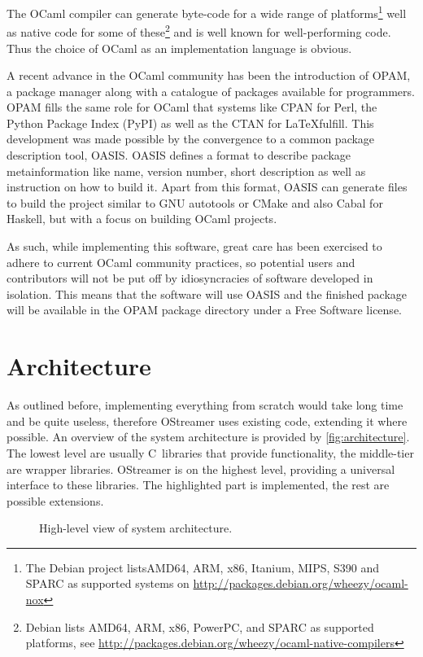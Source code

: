 \documentclass[parskip=half]{scrreprt}
\begin{document}
The OCaml compiler can generate byte-code for a wide range of
platforms\footnote{The Debian project listsAMD64, ARM, x86, Itanium, MIPS, S390
and SPARC as supported systems on
\url{http://packages.debian.org/wheezy/ocaml-nox}} well as native code for some
of these\footnote{Debian lists AMD64, ARM, x86, PowerPC, and SPARC as supported
platforms, see
\url{http://packages.debian.org/wheezy/ocaml-native-compilers}} and is well
known for well-performing code. Thus the choice of OCaml as an implementation
language is obvious.

A recent advance in the OCaml community has been the introduction of OPAM, a
package manager along with a catalogue of packages available for programmers.
OPAM fills the same role for OCaml that systems like CPAN for Perl, the Python
Package Index (PyPI) as well as the CTAN for \LaTeX fulfill. This development
was made possible by the convergence to a common package description tool,
OASIS. OASIS defines a format to describe package metainformation like name,
version number, short description as well as instruction on how to build it.
Apart from this format, OASIS can generate files to build the project similar
to GNU autotools or CMake and also Cabal for Haskell, but with a focus on
building OCaml projects.

As such, while implementing this software, great care has been exercised to
adhere to current OCaml community practices, so potential users and
contributors will not be put off by idiosyncracies of software developed in
isolation. This means that the software will use OASIS and the finished package
will be available in the OPAM package directory under a Free Software license.

\section{Architecture}
\label{sec:architecture}

As outlined before, implementing everything from scratch would take long time
and be quite useless, therefore OStreamer uses existing code, extending it
where possible. An overview of the system architecture is provided by
\autoref{fig:architecture}. The lowest level are usually C~libraries that
provide functionality, the middle-tier are wrapper libraries. OStreamer is on
the highest level, providing a universal interface to these libraries. The
highlighted part is implemented, the rest are possible extensions.

\begin{figure}[h]
  \centering
  
  \caption{High-level view of system architecture.}
  \label{fig:architecture}
\end{figure}
\end{document}
